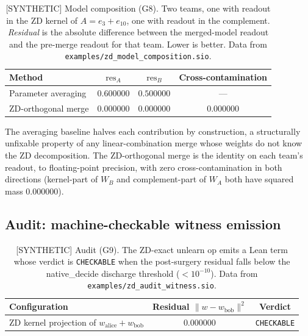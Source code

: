 \documentclass{article}
\begin{document}
\begin{table}[h]
\centering
\caption{[SYNTHETIC] Model composition (G8).  Two teams, one with readout in the
         ZD kernel of $A = e_3 + e_{10}$, one with readout in the
         complement.  \emph{Residual} is the absolute difference
         between the merged-model readout and the pre-merge readout
         for that team.  Lower is better.  Data from
         \texttt{examples/zd\_model\_composition.sio}.}
\label{tab:composition}
\begin{tabular}{lccc}
\toprule
Method & $\mathrm{res}_A$ & $\mathrm{res}_B$ & Cross-contamination \\
\midrule
Parameter averaging & $0.600000$ & $0.500000$ & --- \\
ZD-orthogonal merge & $\mathbf{0.000000}$ & $\mathbf{0.000000}$ & $0.000000$ \\
\bottomrule
\end{tabular}
\end{table}

The averaging baseline halves each contribution by construction,
a structurally unfixable property of any linear-combination merge whose
weights do not know the ZD decomposition.  The ZD-orthogonal merge is
the identity on each team's readout, to floating-point precision, with
zero cross-contamination in both directions (kernel-part of $W_B$ and
complement-part of $W_A$ both have squared mass $0.000000$).

\subsection{Audit: machine-checkable witness emission}

\begin{table}[h]
\centering
\caption{[SYNTHETIC] Audit (G9).  The ZD-exact unlearn op emits a Lean term whose
         verdict is \texttt{CHECKABLE} when the post-surgery residual
         falls below the native\_decide discharge threshold
         ($< 10^{-10}$).  Data from \texttt{examples/zd\_audit\_witness.sio}.}
\label{tab:audit}
\begin{tabular}{lcc}
\toprule
Configuration & Residual $\|w - w_{\mathrm{bob}}\|^2$ & Verdict \\
\midrule
ZD kernel projection of $w_{\mathrm{alice}} + w_{\mathrm{bob}}$
  & $\mathbf{0.000000}$ & \texttt{CHECKABLE} \\
\bottomrule
\end{tabular}
\end{table}
\end{document}
